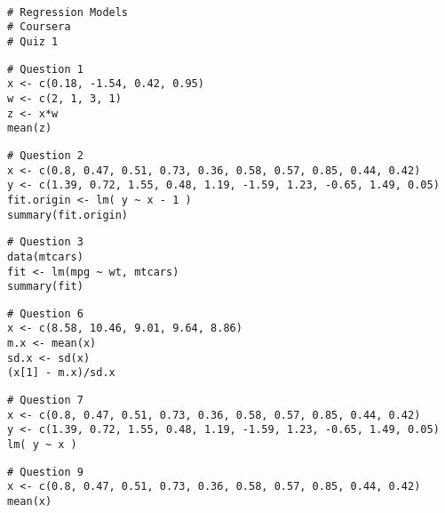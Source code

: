 \begin{frame}[fragile]
\begin{framed}
\begin{verbatim}

# Regression Models
# Coursera
# Quiz 1

\end{verbatim}
\end{framed}
\end{frame}
\begin{frame}[fragile]
\begin{framed}
\begin{verbatim}
# Question 1
x <- c(0.18, -1.54, 0.42, 0.95)
w <- c(2, 1, 3, 1)
z <- x*w
mean(z)

\end{verbatim}
\end{framed}
\end{frame}
\begin{frame}[fragile]
\begin{framed}
\begin{verbatim}
# Question 2
x <- c(0.8, 0.47, 0.51, 0.73, 0.36, 0.58, 0.57, 0.85, 0.44, 0.42)
y <- c(1.39, 0.72, 1.55, 0.48, 1.19, -1.59, 1.23, -0.65, 1.49, 0.05)
fit.origin <- lm( y ~ x - 1 )
summary(fit.origin)
\end{verbatim}
\end{framed}
\end{frame}
\begin{frame}[fragile]
\begin{framed}
\begin{verbatim}
# Question 3
data(mtcars)
fit <- lm(mpg ~ wt, mtcars)
summary(fit)
\end{verbatim}
\end{framed}
\end{frame}
\begin{frame}[fragile]
\begin{framed}
\begin{verbatim}
# Question 6
x <- c(8.58, 10.46, 9.01, 9.64, 8.86)
m.x <- mean(x)
sd.x <- sd(x)
(x[1] - m.x)/sd.x
\end{verbatim}
\end{framed}
\end{frame}
\begin{frame}[fragile]
\begin{framed}
\begin{verbatim}
# Question 7
x <- c(0.8, 0.47, 0.51, 0.73, 0.36, 0.58, 0.57, 0.85, 0.44, 0.42)
y <- c(1.39, 0.72, 1.55, 0.48, 1.19, -1.59, 1.23, -0.65, 1.49, 0.05)
lm( y ~ x )
\end{verbatim}
\end{framed}
\end{frame}
\begin{frame}[fragile]
\begin{framed}
\begin{verbatim}
# Question 9
x <- c(0.8, 0.47, 0.51, 0.73, 0.36, 0.58, 0.57, 0.85, 0.44, 0.42)
mean(x)
\end{verbatim}
\end{framed}
\end{frame}
